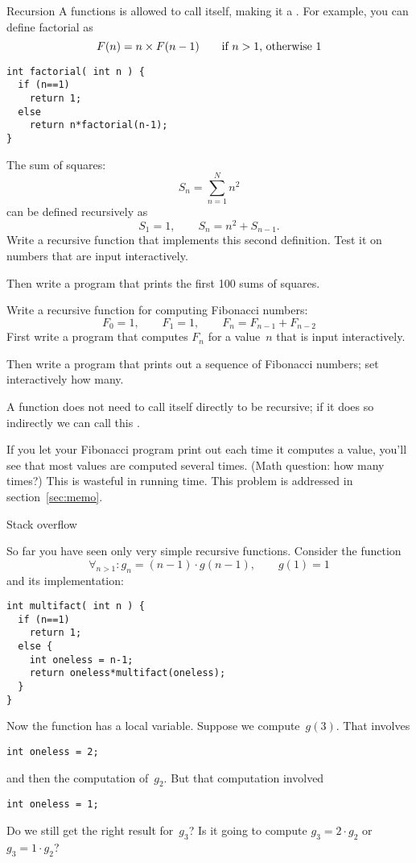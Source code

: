 \begin{slide}{Recursion}
  \label{sl:func-recur}
  A functions is allowed to call itself, making it a .
  For example, you can define factorial as
  \[ F(n) = n \times F(n-1) \qquad \hbox{if $n>1$, otherwise~$1$} \]
\begin{verbatim}
int factorial( int n ) {
  if (n==1)
    return 1;
  else
    return n*factorial(n-1);
}
\end{verbatim}
\end{slide}

\begin{exercise}
  \label{ex:recur-sum}
  The sum of squares:
  \[ S_n = \sum_{n=1}^N n^2 \]
  can be defined recursively as
  \[ S_1=1,\qquad S_n = n^2 + S_{n-1}. \]
  Write a recursive function that implements this second definition.
  Test it on numbers that are input interactively.

  Then write a program that prints the first 100 sums of squares.
\end{exercise}

\begin{exercise}
  \label{ex:recur-fib}
  Write a recursive function for computing Fibonacci numbers:
  \[ F_0=1,\qquad F_1=1,\qquad F_{n}=F_{n-1}+F_{n-2} \]
  First write a program that computes $F_n$ for a value~$n$ that is
  input interactively.

  Then write a program that prints out a sequence of Fibonacci
  numbers; set interactively how many.
\end{exercise}

\begin{remark}
  A function does not need to call itself directly to be recursive; if
  it does so indirectly we can call this .
\end{remark}

\begin{remark}
  If you let your Fibonacci program print out each time it computes a
  value, you'll see that most values are computed several times. (Math
  question: how many times?) This is wasteful in running time. This
  problem is addressed in section~\ref{sec:memo}.
\end{remark}

 {Stack overflow}

So far you have seen only very simple recursive functions. Consider
the function
\[ \forall_{n>1}\colon g_n = (n-1)\cdot g(n-1),\qquad g(1)=1 \]
and its implementation:
\begin{verbatim}
int multifact( int n ) {
  if (n==1)
    return 1;
  else {
    int oneless = n-1;
    return oneless*multifact(oneless);
  }
}
\end{verbatim}
Now the function has a local variable. Suppose we compute~$g(3)$. That
involves
\begin{verbatim}
int oneless = 2;
\end{verbatim}
and then the computation of~$g_2$. But that computation involved 
\begin{verbatim}
int oneless = 1;
\end{verbatim}
Do we still get the right result for~$g_3$? Is it going to compute
$g_3=2\cdot g_2$ or $g_3=1\cdot g_2$?

